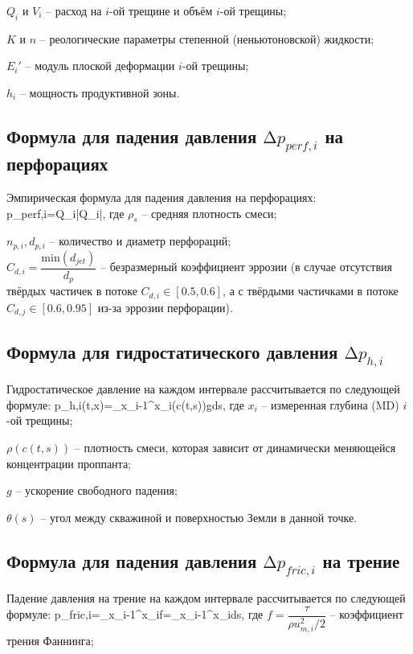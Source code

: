 \documentclass[main.tex]{subfiles}
\begin{document}
$Q_i$ и $V_i$ -- расход на $i$-ой трещине и объём $i$-ой трещины;

$K$ и $n$ -- реологические параметры степенной (неньютоновской) жидкости;

$E_i'$ -- модуль плоской деформации $i$-ой трещины;

$h_i$ -- мощность продуктивной зоны.


\subsection{Формула для падения давления $\text{Δ} p_{perf,i}$ на перфорациях}

Эмпирическая формула для падения давления на перфорациях:
\beq
\Delta p_{perf,i}=Q_i\left|Q_i\right|,
\eeq
где $\rho_s$ -- средняя плотность смеси;

$n_{p,i}, d_{p,i}$ -- количество и диаметр перфораций;
\\

$C_{d,i}=\dfrac{\text{min}(d_{jet})}{d_p}$ -- безразмерный коэффициент эррозии (в случае отсутствия твёрдых частичек в потоке $C_{d,i}\in\left[0.5,0.6\right]$, а с твёрдыми частичками в потоке $C_{d,j}\in\left[0.6,0.95\right]$  из-за эррозии перфорации).

\subsection{Формула для гидростатического давления $\text{Δ} p_{h,i}$}

Гидростатическое давление на каждом интервале рассчитывается по следующей формуле:
\beq
\Delta p_{h,i}(t,x)=\int\limits_{x_{i-1}}^{x_i}{\rho(c(t,s))\cdot g\cdot {}ds},
\eeq
где $x_i$ -- измеренная глубина (MD) $i$-ой трещины;

$\rho(c(t,s))$ -- плотность смеси, которая зависит от динамически меняющейся концентрации проппанта;

$g$ -- ускорение свободного падения;

$\theta(s)$ -- угол между скважиной и поверхностью Земли в данной точке.

\subsection{Формула для падения давления $\text{Δ} p_{fric,i}$ на трение}

Падение давления на трение на каждом интервале рассчитывается по следующей формуле:
\beq
\Delta p_{fric,i}=\int\limits_{x_{i-1}}^{x_i}{f}=\int\limits_{x_{i-1}}^{x_i}{}ds,
\eeq
где $f=\dfrac{\tau}{\rho u_{m,i}^2/2}$ -- коэффициент трения Фаннинга;
\end{document}

